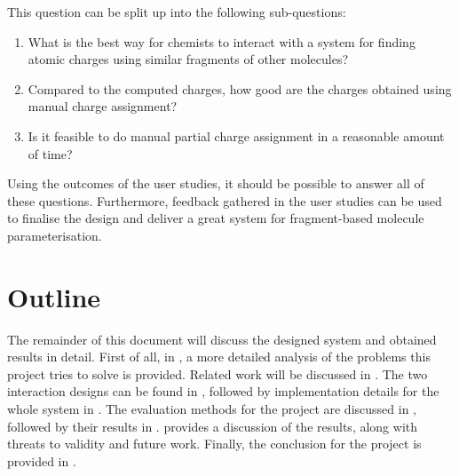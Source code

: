 This question can be split up into the following sub-questions:
\begin{enumerate}
\item What is the best way for chemists to interact with a system for finding atomic charges using similar fragments of other molecules?
\item Compared to the computed charges, how good are the charges obtained using manual charge assignment?
\item Is it feasible to do manual partial charge assignment in a reasonable amount of time?
\end{enumerate}
Using the outcomes of the user studies, it should be possible to answer all of these questions. Furthermore, feedback gathered in the user studies can be used to finalise the design and deliver a great system for fragment-based molecule parameterisation.

\section{Outline}
The remainder of this document will discuss the designed system and obtained results in detail. First of all, in , a more detailed analysis of the problems this project tries to solve is provided. Related work will be discussed in . The two interaction designs can be found in , followed by implementation details for the whole system in . The evaluation methods for the project are discussed in , followed by their results in .  provides a discussion of the results, along with threats to validity and future work. Finally, the conclusion for the project is provided in .
